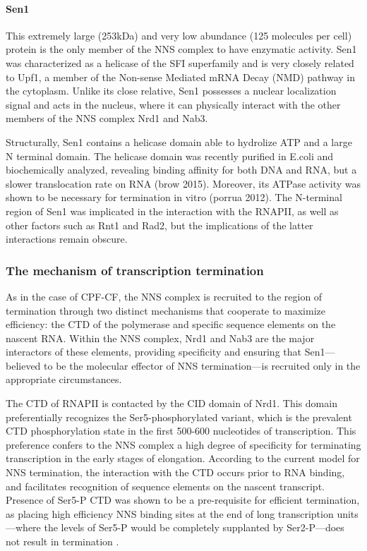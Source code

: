 \paragraph{Sen1}

This extremely large (253kDa) and very low abundance (125 molecules per cell) protein is the only member of the NNS complex to have enzymatic activity. 
Sen1 was characterized as a helicase of the SFI superfamily and is very closely related to Upf1, a member of the Non-sense Mediated mRNA Decay (NMD) pathway in the cytoplasm. 
Unlike its close relative, Sen1 possesses a nuclear localization signal and acts in the nucleus, where it can physically interact with the other members of the NNS complex Nrd1 and Nab3. 

Structurally, Sen1 contains a helicase domain able to hydrolize ATP and a large N terminal domain. 
The helicase domain was recently purified in E.coli and biochemically analyzed, revealing binding affinity for both DNA and RNA, but a slower translocation rate on RNA (brow 2015). 
Moreover, its ATPase activity was shown to be necessary for termination in vitro (porrua 2012). 
The N-terminal region of Sen1 was implicated in the interaction with the RNAPII, as well as other factors such as Rnt1 and Rad2, but the implications of the latter interactions remain obscure.

\subsubsection{The mechanism of transcription termination}

As in the case of CPF-CF, the NNS complex is recruited to the region of termination through two distinct mechanisms that cooperate to maximize efficiency: the CTD of the polymerase and specific sequence elements on the nascent RNA. 
Within the NNS complex, Nrd1 and Nab3 are the major interactors of these elements, providing specificity and ensuring that Sen1—believed to be the molecular effector of NNS termination—is recruited only in the appropriate circumstances.

The CTD of RNAPII is contacted by the CID domain of Nrd1. 
This domain preferentially recognizes the Ser5-phosphorylated variant, which is the prevalent CTD phosphorylation state in the first 500-600 nucleotides of transcription. 
This preference confers to the NNS complex a high degree of specificity for terminating transcription in the early stages of elongation. 
According to the current model for NNS termination, the interaction with the CTD occurs prior to RNA binding, and facilitates recognition of sequence elements on the nascent transcript.  
Presence of Ser5-P CTD was shown to be a pre-requisite for efficient termination, as placing high efficiency NNS binding sites at the end of long transcription units---where the levels of Ser5-P would be completely supplanted by Ser2-P---does not result in termination \cite{gudipati:2008:phosphorylation}.

